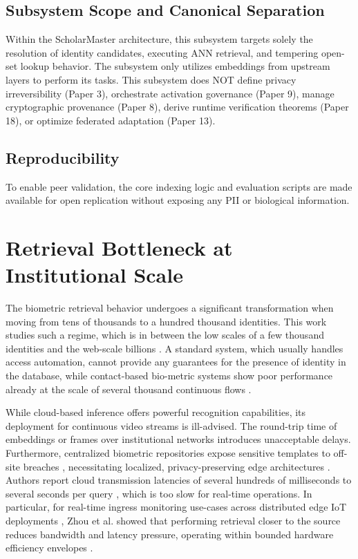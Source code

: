 \documentclass[conference]{IEEEtran}
\begin{document}
\subsection{Subsystem Scope and Canonical Separation}
Within the ScholarMaster architecture, this subsystem targets solely the resolution of identity candidates, executing ANN retrieval, and tempering open-set lookup behavior. The subsystem only utilizes embeddings from upstream layers to perform its tasks. This subsystem does NOT define privacy irreversibility (Paper 3), orchestrate activation governance (Paper 9), manage cryptographic provenance (Paper 8), derive runtime verification theorems (Paper 18), or optimize federated adaptation (Paper 13).

\subsection{Reproducibility}
To enable peer validation, the core indexing logic and evaluation scripts are made available for open replication without exposing any PII or biological information.

\section{Retrieval Bottleneck at Institutional Scale}

The biometric retrieval behavior undergoes a significant transformation when moving from tens of thousands to a hundred thousand identities. This work studies such a regime, which is in between the low scales of a few thousand identities and the web-scale billions \cite{b1, b8}. A standard system, which usually handles access automation, cannot provide any guarantees for the presence of identity in the database, while contact-based bio-metric systems \cite{b1} show poor performance already at the scale of several thousand continuous flows \cite{b8}.

While cloud-based inference offers powerful recognition capabilities, its deployment for continuous video streams is ill-advised. The round-trip time of embeddings or frames over institutional networks introduces unacceptable delays. Furthermore, centralized biometric repositories expose sensitive templates to off-site breaches \cite{b3, b19}, necessitating localized, privacy-preserving edge architectures \cite{b22}. Authors report cloud transmission latencies of several hundreds of milliseconds to several seconds per query \cite{b9}, which is too slow for real-time operations. In particular, for real-time ingress monitoring use-cases across distributed edge IoT deployments \cite{b15}, Zhou et al. \cite{b2} showed that performing retrieval closer to the source reduces bandwidth and latency pressure, operating within bounded hardware efficiency envelopes \cite{b16}.
\end{document}
